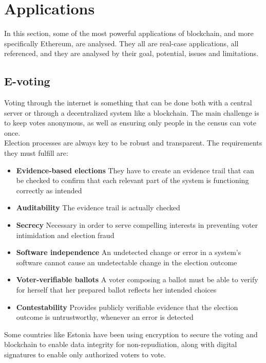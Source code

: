 \documentclass[10pt]{article}
\begin{document}
\begin{multicols}{2}
\begin{itemize}
\end{itemize}

\section{Applications}

In this section, some of the most powerful applications of blockchain, and more specifically Ethereum, are analysed. They all are real-case applications, all referenced, and they are analysed by their goal, potential, issues and limitations.

\subsection{E-voting}

Voting through the internet is something that can be done both with a central server or through a decentralized system like a blockchain. The main challenge is to keep votes anonymous, as well as ensuring only people in the census can vote once.\\

Election processes are always key to be robust and transparent. The requirements they must fulfill are:

\begin{itemize}
	\item \textbf{Evidence-based elections} They have to create an evidence trail that can be checked to confirm that each relevant part of the system is functioning correctly as intended
	\item \textbf{Auditability} The evidence trail is actually checked
	\item \textbf{Secrecy} Necessary in order to serve compelling interests in preventing voter intimidation and election fraud
	\item \textbf{Software independence} An undetected change or error in a system’s software cannot cause an undetectable change in the election outcome
	\item \textbf{Voter-verifiable ballots} A voter composing a ballot must be able to verify for herself that her prepared ballot reflects her intended choices
	\item \textbf{Contestability} Provides publicly verifiable evidence that the election outcome is untrustworthy, whenever an error is detected
\end{itemize}

Some countries like Estonia have been using encryption to secure the voting and blockchain to enable data integrity for non-repudiation, along with digital signatures to enable only authorized voters to vote.\\


\end{multicols}
\end{document}
